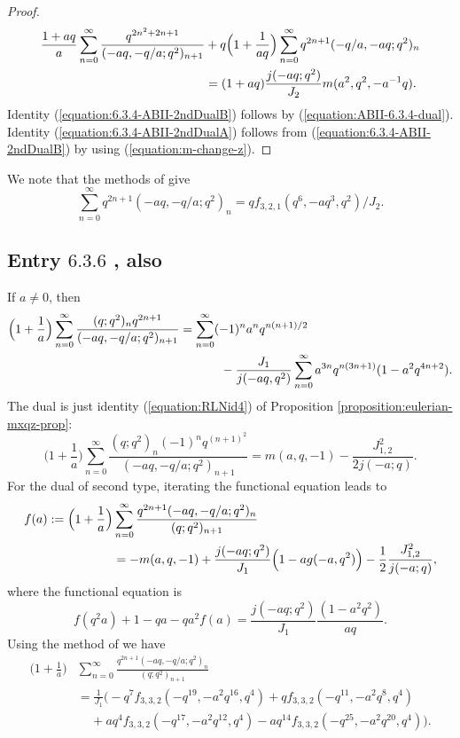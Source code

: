 \documentclass[12pt,reqno]{amsart}
\theoremstyle{remark}
\theoremstyle{definition}
\numberwithin{theorem}{section} \numberwithin{equation}{section}
\numberwithin{example}{section}
\begin{document}
{\begin{proof}
\begin{align*}
\frac{1+aq}{a}\sum_{n=0}^{\infty}\frac{q^{2n^2+2n+1}}{(-aq,-q/a;q^2)_{n+1}}&+q\Big ( 1+\frac{1}{aq}\Big )\sum_{n=0}^{\infty}q^{2n+1}(-q/a,-aq;q^2)_n\notag\\
&=(1+aq)\frac{j(-aq;q^2)}{J_2}m(a^2,q^2,-a^{-1}q).
\end{align*}
Identity (\ref{equation:6.3.4-ABII-2ndDualB}) follows by (\ref{equation:ABII-6.3.4-dual}).  Identity (\ref{equation:6.3.4-ABII-2ndDualA}) follows from (\ref{equation:6.3.4-ABII-2ndDualB}) by using (\ref{equation:m-change-z}).
\end{proof}
We note that the methods of \cite{L} give
\begin{equation}
\sum_{n=0}^{\infty}q^{2n+1}(-aq,-q/a;q^2)_{n}=qf_{3,2,1}(q^6,-aq^3,q^2)/J_2.
\end{equation}

\subsection{Entry $6.3.6$ \cite{ABII}, also \cite[p. 8]{RLN}}
If $a\ne 0$, then
\begin{align}
\Big ( 1+\frac{1}{a}\Big )\sum_{n=0}^{\infty}\frac{(q;q^2)_nq^{2n+1}}{(-aq,-q/a;q^2)_{n+1}}
&=\sum_{n=0}^{\infty}(-1)^na^{n}q^{n(n+1)/2}\label{equation:ABII-6.3.6}\\
& \ \ \ \ \ \ \ \ \ \ -\frac{J_1}{j(-aq,q^2)}\sum_{n=0}^{\infty}a^{3n}q^{n(3n+1)}(1-a^2q^{4n+2}).\notag
\end{align}
The dual is just identity (\ref{equation:RLNid4}) of Proposition \ref{proposition:eulerian-mxqz-prop}:
\begin{equation}
\Big ( 1+\frac{1}{a}\Big )\sum_{n=0}^{\infty}\frac{(q;q^2)_n(-1)^nq^{(n+1)^2}}{(-aq,-q/a;q^2)_{n+1}}=m(a,q,-1)-\frac{J_{1,2}^2}{2j(-a;q)}.\label{equation:ABII-6.3.6-dual}
\end{equation}
For the dual of second type, iterating the functional equation leads to
\begin{align}
f(a):=\Big ( 1+\frac{1}{a}\Big )&\sum_{n=0}^{\infty}\frac{q^{2n+1}(-aq,-q/a;q^2)_{n}}{(q;q^2)_{n+1}}\label{equation:ABII-6.3.6-dualtypeII}\\
&=-m(a,q,-1)+\frac{j(-aq;q^2)}{J_1}\Big ( 1-ag(-a,q^2)\Big )-\frac{1}{2}\frac{J_{1,2}^2}{j(-a;q)},\notag
\end{align}
where the functional equation is
\begin{equation}
f(q^2a)+1-qa-qa^2f(a)=\frac{j(-aq;q^2)}{J_1}\frac{(1-a^2q^2)}{aq}.
\end{equation}
Using the method of \cite{L} we have
\begin{align*}
\Big ( 1+\frac{1}{a}\Big )&\sum_{n=0}^{\infty}\frac{q^{2n+1}(-aq,-q/a;q^2)_{n}}{(q;q^2)_{n+1}}\\
&=\frac{1}{J_1}\Big ( -q^7f_{3,3,2}(-q^{19},-a^2q^{16},q^4)+qf_{3,3,2}(-q^{11},-a^2q^{8},q^4)\\
&\ \ \ \ \ +aq^{4}f_{3,3,2}(-q^{17},-a^2q^{12},q^4)-aq^{14}f_{3,3,2}(-q^{25},-a^2q^{20},q^4)\Big).
\end{align*}

}
\end{document}
